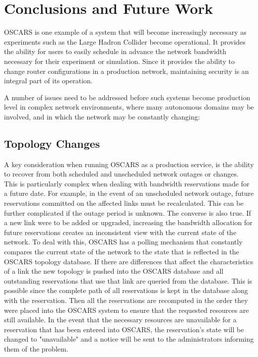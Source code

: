 \documentclass[conference]{IEEEtran}
\begin{document}
\section{Conclusions and Future Work}

OSCARS is one example of a system that will become increasingly necessary
as experiments such as the Large Hadron Collider become operational.  It
provides the ability for users to easily schedule in advance the 
network bandwidth necessary for their experiment or simulation.  Since it
provides the ability to change router configurations in a production network,
maintaining security is an integral part of its operation.

A number of issues need to be addressed before such systems become
production level in complex network environments, where many autonomous
domains may be involved, and in which the network may be constantly
changing:

\subsection{Topology Changes}

A key consideration when running OSCARS as a production service, is the ability
to recover from both scheduled and unscheduled network outages or changes.  This
is particularly complex when dealing with bandwidth reservations made for a
future date.  For example, in the event of an unscheduled network outage, future
reservations committed on the affected links must be recalculated. This can be
further complicated if the outage period is unknown.  The converse is also true.
If a new link were to be added or upgraded, increasing the bandwidth allocation
for future reservations creates an inconsistent view with the current state of
the network.  To deal with this, OSCARS
has a polling mechanism that constantly
compares the current state of the network to the state that is reflected in the
OSCARS topology database. If there are differences that affect the
characteristics of a link the new topology is pushed into the OSCARS database
and all outstanding reservations that use that link are queried from the
database. This is possible since the complete path of all reservations is kept
in the database along with the reservation. Then all the reservations are
recomputed in the order they were placed into the OSCARS system to ensure that
the requested resources are still available.  In the event that the necessary
resources are unavailable for a reservation that has been entered into OSCARS,
the reservation's state will be changed to "unavailable" and a notice will be
sent to the administrators informing them of the problem.
\end{document}
